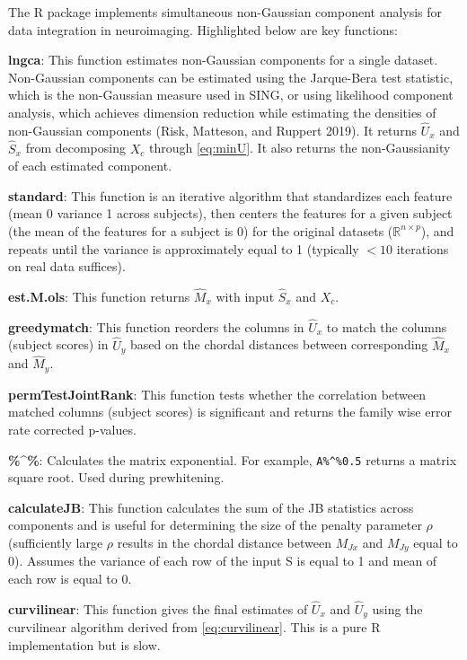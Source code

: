 The R package  implements simultaneous non-Gaussian component analysis for data integration in neuroimaging. Highlighted below are key functions:

\textbf{lngca}: This function estimates non-Gaussian components for a single dataset. Non-Gaussian components can be estimated using the Jarque-Bera test statistic, which is the non-Gaussian measure used in SING, or using likelihood component analysis, which achieves dimension reduction while estimating the densities of non-Gaussian components (Risk, Matteson, and Ruppert 2019). It returns \(\widehat{U}_{x}\) and \(\widehat{S}_{x}\) from decomposing \(X_{c}\) through \eqref{eq:minU}. It also returns the non-Gaussianity of each estimated component.

\textbf{standard}: This function is an iterative algorithm that standardizes each feature (mean 0 variance 1 across subjects), then centers the features for a given subject (the mean of the features for a subject is 0) for the original datasets (\(\mathbb{R}^{n\times p}\)), and repeats until the variance is approximately equal to 1 (typically \(<10\) iterations on real data suffices).

\textbf{est.M.ols}: This function returns \(\widehat{M}_{x}\) with input \(\widehat{S}_{x}\) and \(X_{c}\).

\textbf{greedymatch}: This function reorders the columns in \(\widehat{U}_{x}\) to match the columns (subject scores) in \(\widehat{U}_{y}\) based on the chordal distances between corresponding \(\widehat{M}_{x}\) and \(\widehat{M}_{y}\).

\textbf{permTestJointRank}: This function tests whether the correlation between matched columns (subject scores) is significant and returns the family wise error rate corrected p-values.

\textbf{\%\^{}\%}: Calculates the matrix exponential. For example, \texttt{A\%\^{}\%0.5} returns a matrix square root. Used during prewhitening.

\textbf{calculateJB}: This function calculates the sum of the JB statistics across components and is useful for determining the size of the penalty parameter \(\rho\) (sufficiently large \(\rho\) results in the chordal distance between \(M_{Jx}\) and \(M_{Jy}\) equal to 0). Assumes the variance of each row of the input S is equal to 1 and mean of each row is equal to 0.

\textbf{curvilinear}: This function gives the final estimates of \(\widehat{U}_{x}\) and \(\widehat{U}_{y}\) using the curvilinear algorithm derived from \eqref{eq:curvilinear}. This is a pure R implementation but is slow.

